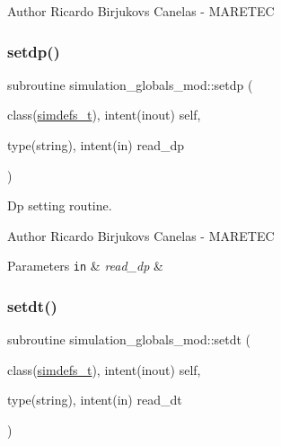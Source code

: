 \begin{DoxyAuthor}{Author}
Ricardo Birjukovs Canelas -\/ M\+A\+R\+E\+T\+EC 
\end{DoxyAuthor}
\mbox{\label{namespacesimulation__globals__mod_acb8e3762572266b40a0deb166dded33a}} 
\subsubsection{\texorpdfstring{setdp()}{setdp()}}
{\footnotesize\ttfamily subroutine simulation\+\_\+globals\+\_\+mod\+::setdp (\begin{DoxyParamCaption}\item[{class(\hyperlink{structsimulation__globals__mod_1_1simdefs__t}{simdefs\+\_\+t}), intent(inout)}]{self,  }\item[{type(string), intent(in)}]{read\+\_\+dp }\end{DoxyParamCaption})\hspace{0.3cm}{\ttfamily [private]}}



Dp setting routine. 

\begin{DoxyAuthor}{Author}
Ricardo Birjukovs Canelas -\/ M\+A\+R\+E\+T\+EC 
\end{DoxyAuthor}

\begin{DoxyParams}[1]{Parameters}
\mbox{\tt in}  & {\em read\+\_\+dp} & \\
\hline
\end{DoxyParams}
\mbox{\label{namespacesimulation__globals__mod_aecf75eeccef4eeae6d10ab26cf2dcfcf}} 
\subsubsection{\texorpdfstring{setdt()}{setdt()}}
{\footnotesize\ttfamily subroutine simulation\+\_\+globals\+\_\+mod\+::setdt (\begin{DoxyParamCaption}\item[{class(\hyperlink{structsimulation__globals__mod_1_1simdefs__t}{simdefs\+\_\+t}), intent(inout)}]{self,  }\item[{type(string), intent(in)}]{read\+\_\+dt }\end{DoxyParamCaption})\hspace{0.3cm}{\ttfamily [private]}}



